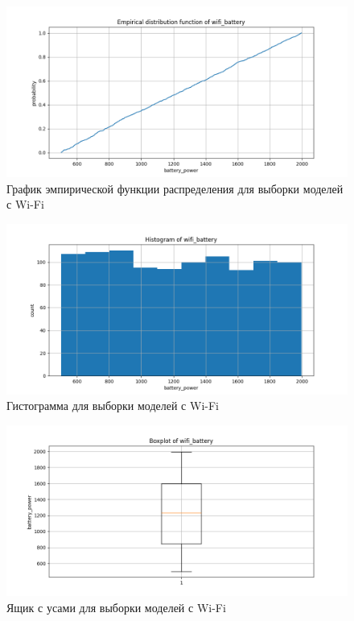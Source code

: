 \documentclass[a4paper, 12pt]{article}
\begin{document}
    \begin{figure}[H]
        \centering
        \includegraphics[scale=0.55]{wifi_battery_edf.png}
        \captionsetup{skip=0pt}
        \caption{График эмпирической функции распределения для выборки моделей с Wi-Fi}
        \label{fig:wifibedf}
    \end{figure}
    \begin{figure}[H]
        \centering
        \includegraphics[scale=0.55]{wifi_battery_hist.png}
        \captionsetup{skip=0pt}
        \caption{Гистограмма для выборки моделей с Wi-Fi}
        \label{fig:wifibhist}
    \end{figure}
    \begin{figure}[H]
        \centering
        \includegraphics[scale=0.55]{wifi_battery_box.png}
        \captionsetup{skip=0pt}
        \caption{Ящик с усами для выборки моделей с Wi-Fi}
        \label{fig:wifibbox}
    \end{figure}
\end{document}
